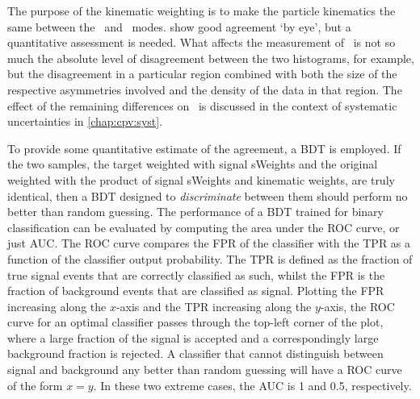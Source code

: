 The purpose of the kinematic weighting is to make the particle kinematics the 
same between the \pKK\ and \ppipi\ modes.
show good agreement `by eye', but a quantitative assessment is needed.
What affects the measurement of \dACP\ is not so much the absolute level of 
disagreement between the two histograms, for example, but the disagreement in a 
particular region combined with both the size of the respective asymmetries 
involved and the density of the data in that region.
The effect of the remaining differences on \dACP\ is discussed in the context 
of systematic uncertainties in \cref{chap:cpv:syst}.

To provide some quantitative estimate of the agreement, a \ac{BDT} is employed.
If the two samples, the target weighted with signal sWeights and the original 
weighted with the product of signal sWeights and kinematic weights, are truly 
identical, then a \ac{BDT} designed to \emph{discriminate} between them should 
perform no better than random guessing.
The performance of a \ac{BDT} trained for binary classification can be 
evaluated by computing the area under the \ac{ROC} curve, or just \ac{AUC}.
The \ac{ROC} curve compares the \ac{FPR} of the classifier with the \ac{TPR} as 
a function of the classifier output probability.
The \ac{TPR} is defined as the fraction of true signal events that are 
correctly classified as such, whilst the \ac{FPR} is the fraction of background 
events that are classified as signal.
Plotting the \ac{FPR} increasing along the $x$-axis and the \ac{TPR} increasing 
along the $y$-axis, the \ac{ROC} curve for an optimal classifier passes through 
the top-left corner of the plot, where a large fraction of the signal is 
accepted and a correspondingly large background fraction is rejected.
A classifier that cannot distinguish between signal and background any better 
than random guessing will have a \ac{ROC} curve of the form $x = y$.
In these two extreme cases, the \ac{AUC} is 1 and 0.5, respectively.

